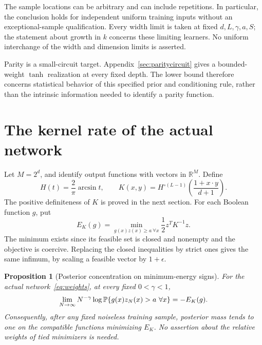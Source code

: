 \documentclass[11pt]{article}
\newtheorem{proposition}[theorem]{Proposition}
\theoremstyle{remark}\newtheorem{remark}[theorem]{Remark}
\newcommand{\R}{\mathbb R}\newcommand{\X}{\mathcal X}
\begin{document}
The sample locations can be arbitrary and can include repetitions.
In particular, the conclusion holds for independent uniform training
inputs without an exceptional-sample qualification. Every width limit
is taken at fixed $d,L,\gamma,a,S$; the statement about growth in $k$
concerns these limiting learners. No uniform interchange of the width
and dimension limits is asserted.

Parity is a small-circuit target. Appendix~\ref{sec:paritycircuit}
gives a bounded-weight $\tanh$ realization at every fixed depth. The
lower bound therefore concerns statistical behavior of this specified
prior and conditioning rule, rather than the intrinsic information
needed to identify a parity function.

\section{The kernel rate of the actual network}
Let $M=2^d$, and identify output functions with vectors in $\R^M$.
Define
\begin{equation}\label{eq:kernel}
 H(t)=\frac2\pi\arcsin t,\qquad
 K(x,y)=H^{\circ(L-1)}\!\left(\frac{1+x\cdot y}{d+1}\right).
\end{equation}
The positive definiteness of $K$ is proved in the next section.
For each Boolean function $g$, put
\begin{equation}\label{eq:energy}
 E_K(g)=\min_{g(x)z(x)\ge a\ \forall x}\frac12 z^TK^{-1}z.
\end{equation}
The minimum exists since its feasible set is closed and nonempty and
the objective is coercive. Replacing the closed inequalities by strict
ones gives the same infimum, by scaling a feasible vector by $1+\epsilon$.

\begin{proposition}[Posterior concentration on minimum-energy signs]
\label{prop:rate}
For the actual network~\eqref{eq:weights}, at every fixed
$0<\gamma<1$,
\begin{equation}\label{eq:rate}
 \lim_{N\to\infty}N^{-\gamma}\log
 \mathbb P\{g(x)z_N(x)>a\ \forall x\}=-E_K(g).
\end{equation}
Consequently, after any fixed noiseless training sample, posterior
mass tends to one on the compatible functions minimizing $E_K$.
No assertion about the relative weights of tied minimizers is needed.
\end{proposition}
\end{document}
